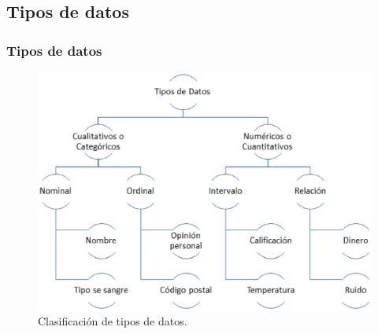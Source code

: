 \subsection{Tipos de datos}
\begin{frame}
\frametitle{Tipos de datos}

\begin{figure}[h]
\centering
\includegraphics[width=0.85\columnwidth]{Imagenes/clasifnums.eps}
\caption{Clasificaci\'on de tipos de datos.}
\label{fig:clasnums}
\end{figure}

\end{frame}